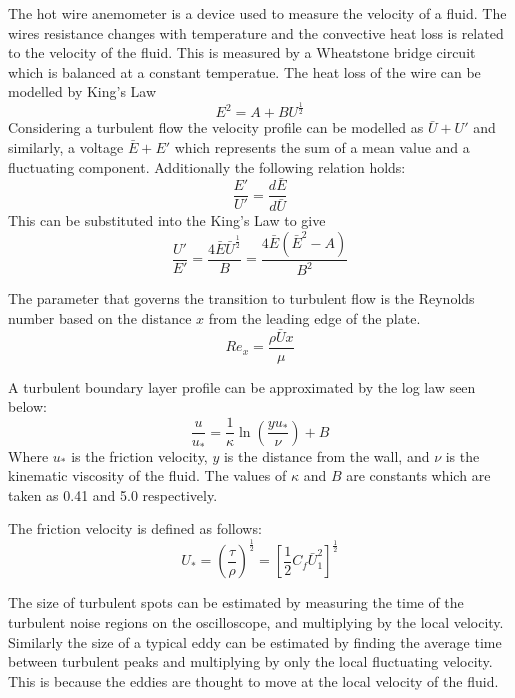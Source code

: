 \documentclass{article}
\begin{document}
The hot wire anemometer is a device used to measure the velocity of a fluid.
The wires resistance changes with temperature and the convective heat loss is related to the velocity of the fluid.
This is measured by a Wheatstone bridge circuit which is balanced at a constant temperatue.
The heat loss of the wire can be modelled by King's Law
\begin{equation}
    E^2 = A + B U^{\frac{1}{2}}
\end{equation}
Considering a turbulent flow the velocity profile can be modelled as $\bar{U} + U'$ and similarly, a voltage $\bar{E} + E'$ which represents the sum of a mean value and a fluctuating component.
Additionally the following relation holds:
\begin{equation}
    \frac{E'}{U'} = \frac{d\bar{E}}{d\bar{U}}
\end{equation}
This can be substituted into the King's Law to give
\begin{equation}
    \frac{U'}{E'} = \frac{4\bar{E}\bar{U}^{\frac{1}{2}}}{B} = \frac{4\bar{E}(\bar{E}^2 - A)}{B^2}
    \label{eq:small_kings}
\end{equation}

The parameter that governs the transition to turbulent flow is the Reynolds number based on the distance $x$ from the leading edge of the plate.
\begin{equation}
    Re_x = \frac{\rho \bar{U}x}{\mu}
\end{equation}

A turbulent boundary layer profile can be approximated by the log law seen below:
\begin{equation}
    \frac{u}{u_*} = \frac{1}{\kappa} \ln \left( \frac{y u_*}{\nu} \right) + B
\end{equation}
Where $u_*$ is the friction velocity, $y$ is the distance from the wall, and $\nu$ is the kinematic viscosity of the fluid.
The values of $\kappa$ and $B$ are constants which are taken as 0.41 and 5.0 respectively.

The friction velocity is defined as follows:
\begin{equation}
    U_* = \left( \frac{\tau}{\rho} \right)^{\frac{1}{2}} = \left[ \frac{1}{2}C_f \bar{ U}_1^2 \right]^{\frac{1}{2}}
    \label{eq:friction_velocity}
\end{equation}

The size of turbulent spots can be estimated by measuring the time of the turbulent noise regions on the oscilloscope, and multiplying by the local velocity.
Similarly the size of a typical eddy can be estimated by finding the average time between turbulent peaks and multiplying by only the local fluctuating velocity.
This is because the eddies are thought to move at the local velocity of the fluid. %
\end{document}

